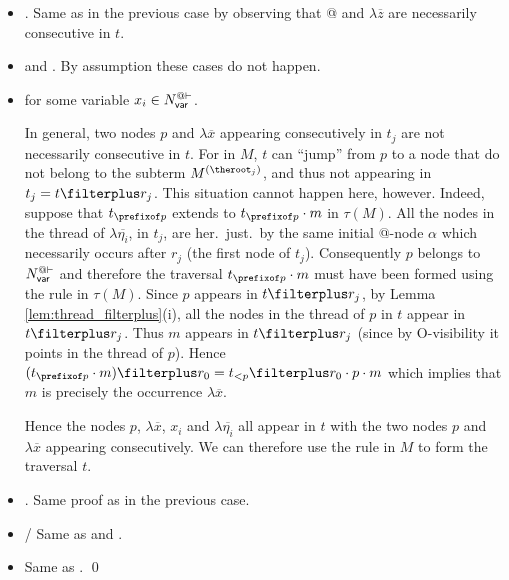 \begin{itemize}
    \item {}
          . Same as in the previous case by observing that @ and $\lambda \overline{z}$
are necessarily consecutive in $t$.

    \item {} and . By assumption these cases do not happen.

    \item {}
     for some
        variable $x_i \in N_{\sf var}^{@\vdash}$.

In general, two nodes $p$ and $\lambda \overline{x}$ appearing consecutively in $t_j$ are not necessarily consecutive in $t$. For in $M$, $t$ can ``jump'' from $p$ to a node that do not belong to the subterm $M^{(\theroot_j)}$, and thus not appearing in $t_j = t\filterplus r_j$.
This situation cannot happen here, however. Indeed, suppose that $t_{\prefixof p}$ extends to $t_{\prefixof p} \cdot m$ in $\tau(M)$.
 All the nodes in the thread of $\lambda \overline{\eta_i}$, in $t_j$, are her.\ just.\ by the same initial @-node $\alpha$ which necessarily occurs after $r_j$ (the first node of $t_j$). Consequently $p$ belongs to $N_{\sf var}^{@\vdash}$ and therefore
the traversal $t_{\prefixof p}\cdot m$ must have been formed using the rule  in $\tau(M)$.
Since $p$ appears in $t\filterplus r_j$, by Lemma \ref{lem:thread_filterplus}(i), all the nodes in the thread of $p$ in $t$ appear
in $t\filterplus r_j$. Thus $m$ appears in $t\filterplus r_j$ (since by O-visibility it points in the thread of $p$).
Hence $(t_{\prefixof p} \cdot m)\filterplus r_0 =  t_{<p}\filterplus r_0 \cdot p \cdot m$ which implies that $m$ is precisely the occurrence $\lambda \overline{x}$.

Hence the nodes $p$, $\lambda \overline{x}$, $x_i$ and $\lambda \overline{\eta_i}$ all appear in $t$
with the two nodes $p$ and $\lambda \overline{x}$ appearing consecutively. We can therefore use the rule  in $M$ to form the traversal $t$.

    \item {}. Same proof as in the previous case.
    \item {}/ Same as  and .
    \item {} Same as  .
\qed
  \end{itemize}



